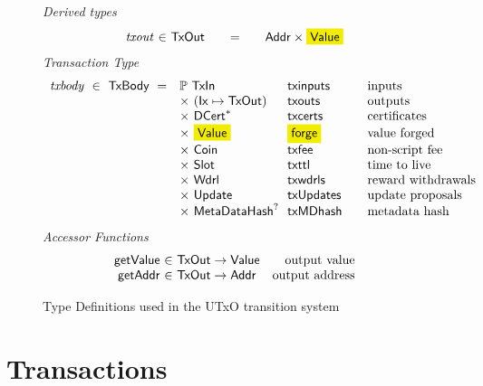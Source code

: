 \begin{figure*}[t!]
  \emph{Derived types}
  \begin{equation*}
    \begin{array}{r@{~\in~}l@{\qquad=\qquad}lr}
      \var{txout} & \TxOut & \Addr \times \hldiff{\Value}
      \\
    \end{array}
  \end{equation*}
  \emph{Transaction Type}
  \begin{equation*}
    \begin{array}{r@{~~}l@{~~}l@{\qquad}l}
      \var{txbody} ~\in~ \TxBody ~=~
      & \powerset{\TxIn} & \fun{txinputs}& \text{inputs}\\
      &\times ~(\Ix \mapsto \TxOut) & \fun{txouts}& \text{outputs}\\
      & \times~ \seqof{\DCert} & \fun{txcerts}& \text{certificates}\\
       & \times ~\hldiff{\Value}  & \hldiff{\fun{forge}} &\text{value forged}\\
       & \times ~\Coin & \fun{txfee} &\text{non-script fee}\\
       & \times ~\Slot & \fun{txttl} & \text{time to live}\\
       & \times~ \Wdrl  & \fun{txwdrls} &\text{reward withdrawals}\\
       & \times ~\Update  & \fun{txUpdates} & \text{update proposals}\\
       & \times ~\MetaDataHash^? & \fun{txMDhash} & \text{metadata hash}
    \end{array}
  \end{equation*}
  \emph{Accessor Functions}
  \begin{equation*}
    \begin{array}{r@{~\in~}lr}
      \fun{getValue} & \TxOut \to \Value & \text{output value} \\
      \fun{getAddr} & \TxOut \to \Addr & \text{output address}
    \end{array}
  \end{equation*}
  \caption{Type Definitions used in the UTxO transition system}
  \label{fig:defs:utxo-shelley}
\end{figure*}

\section{Transactions}
\label{sec:transactions}

